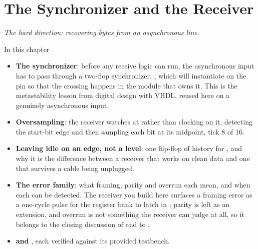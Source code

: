 
\chapter{The Synchronizer and the Receiver}
\label{c3:ch}

{\large\itshape The hard direction: recovering bytes from an asynchronous line.\par}

\begin{chapterbox}{In this chapter}
\begin{itemize}
  \item \textbf{The synchronizer}: before any receive logic can run, the asynchronous 
    input has to pass through a two-flop synchronizer, , which  will
    instantiate on the pin so that the crossing happens in the module that owns it. This is the
    metastability lesson from digital design with VHDL, reused here on a genuinely asynchronous
    input.
  \item \textbf{Oversampling}: the receiver watches  at  rather than
    clocking on it, detecting the start-bit edge and then sampling each bit at its midpoint, tick 8
    of 16.
  \item \textbf{Leaving idle on an edge, not a level}: one flip-flop of history for ,
    and why it is the difference between a receiver that works on clean data and one that survives
    a cable being unplugged.
  \item \textbf{The error family}: what framing, parity and overrun each mean, and when each can be
    detected. The receiver you build here surfaces a framing error as a one-cycle pulse for the
    register bank to latch in ; parity is left as an extension, and overrun is not
    something the receiver can judge at all, so it belongs to the closing discussion of
     and to .
  \item \textbf{ and }, each verified against its provided
    testbench.
\end{itemize}
\end{chapterbox}

